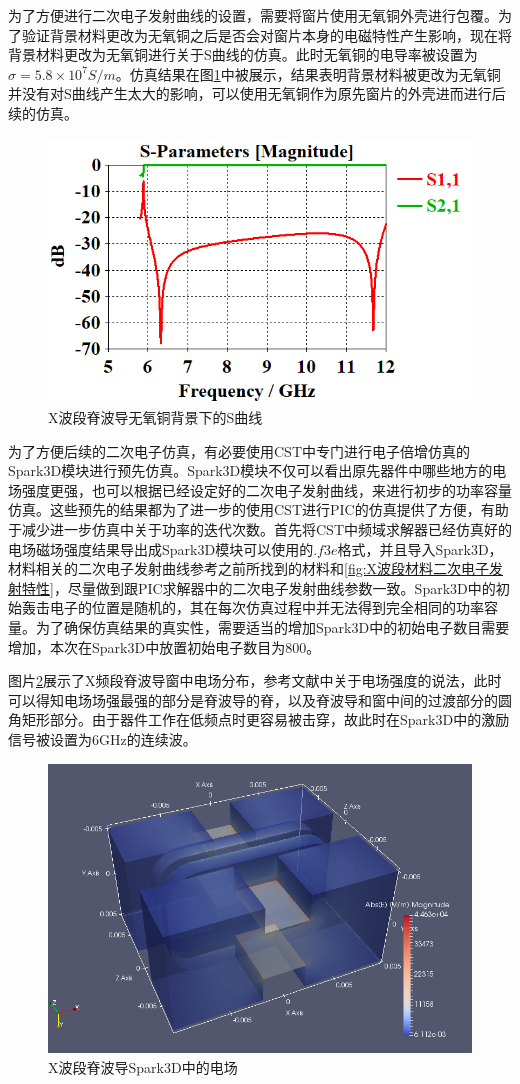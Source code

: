 \documentclass[master]{thesis-uestc}
\begin{document}
为了方便进行二次电子发射曲线的设置，需要将窗片使用无氧铜外壳进行包覆。为了验证背景材料更改为无氧铜之后是否会对窗片本身的电磁特性产生影响，现在将背景材料更改为无氧铜进行关于S曲线的仿真。此时无氧铜的电导率被设置为$\sigma = 5.8 \times 10^7 S/m$。仿真结果在图\ref{fig:X无氧铜背景}中被展示，结果表明背景材料被更改为无氧铜并没有对S曲线产生太大的影响，可以使用无氧铜作为原先窗片的外壳进而进行后续的仿真。
\begin{figure}[!htb]
    \centering
    \includegraphics[width=0.5\linewidth]{pic/chapter3/X脊波导窗无氧铜.png}
    \caption{X波段脊波导无氧铜背景下的S曲线}
    \label{fig:X无氧铜背景}
\end{figure}

为了方便后续的二次电子仿真，有必要使用CST中专门进行电子倍增仿真的Spark3D模块进行预先仿真。Spark3D模块不仅可以看出原先器件中哪些地方的电场强度更强，也可以根据已经设定好的二次电子发射曲线，来进行初步的功率容量仿真。这些预先的结果都为了进一步的使用CST进行PIC的仿真提供了方便，有助于减少进一步仿真中关于功率的迭代次数。首先将CST中频域求解器已经仿真好的电场磁场强度结果导出成Spark3D模块可以使用的$.f3e$格式，并且导入Spark3D，材料相关的二次电子发射曲线参考之前所找到的材料和\ref{fig:X波段材料二次电子发射特性}，尽量做到跟PIC求解器中的二次电子发射曲线参数一致。Spark3D中的初始轰击电子的位置是随机的，其在每次仿真过程中并无法得到完全相同的功率容量。为了确保仿真结果的真实性，需要适当的增加Spark3D中的初始电子数目需要增加，本次在Spark3D中放置初始电子数目为800。

图片\ref{fig:X波段Spark3D中的电场}展示了X频段脊波导窗中电场分布，参考文献\cite{guobao_2019_intera}中关于电场强度的说法，此时可以得知电场场强最强的部分是脊波导的脊，以及脊波导和窗中间的过渡部分的圆角矩形部分。由于器件工作在低频点时更容易被击穿，故此时在Spark3D中的激励信号被设置为6GHz的连续波。
\begin{figure}[!htb]
    \centering
    \includegraphics[width=0.5\linewidth]{pic/chapter3/X波段Spark3D中的电场.png}
    \caption{X波段脊波导Spark3D中的电场}
    \label{fig:X波段Spark3D中的电场}
\end{figure}
\end{document}
